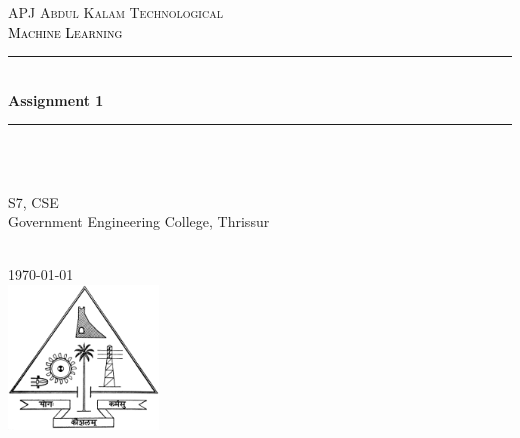 \begin{titlepage}
\newcommand{\HRule}{\rule{\linewidth}{0.5mm}}


\center
    \textsc{\LARGE APJ Abdul Kalam Technological \\[1.3cm]}
    \textsc{\Large \textcolor{black}{Machine Learning}}\\[0.2cm]
    
    \HRule \\[0.4cm]
    { \huge \bfseries \textcolor{DeepMagenta}{Assignment 1}}\\[0.4cm]
    \HRule \\[1.5cm]
 
    \begin{minipage}{0.4\textwidth}
    \begin{center} \large
    \emph{ }\\
        S7, CSE \\
        Government Engineering College, Thrissur
    \end{center}
    \end{minipage} \\[2cm]
    
    {\large \today}\\[2cm] 

    \includegraphics[width=40mm,scale=0.5]{Images/KTU_Logo.png}
\vfill 
\end{titlepage}